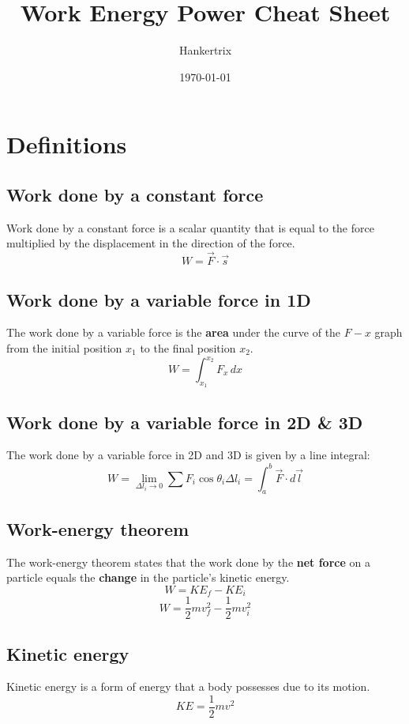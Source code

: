 \documentclass[11pt]{article}
\author{Hankertrix}
\date{\today}
\title{Work Energy Power Cheat Sheet}
\begin{document}
\maketitle
\setcounter{tocdepth}{2}
\tableofcontents

\newpage

\section{Definitions}
\label{sec:org8ba2733}

\subsection{Work done by a constant force}
\label{sec:org7d6426a}
Work done by a constant force is a scalar quantity that is equal to the force multiplied by the displacement in the direction of the force.
\[W = \vec{F} \cdot \vec{s}\]

\subsection{Work done by a variable force in 1D}
\label{sec:org06e703c}
The work done by a variable force is the \textbf{area} under the curve of the \(F-x\) graph from the initial position \(x_1\) to the final position \(x_2\).
\[W = \int_{x_1}^{x_2} F_x \, dx\]

\subsection{Work done by a variable force in 2D \& 3D}
\label{sec:org5fb5338}
The work done by a variable force in 2D and 3D is given by a line integral:
\[W = \lim_{\Delta l_i \rightarrow 0} \sum F_i \cos \theta_i \Delta l_i = \int_a^b \vec{F} \cdot d \vec{l}\]

\subsection{Work-energy theorem}
\label{sec:orgbbe17f6}
The work-energy theorem states that the work done by the \textbf{net force} on a particle equals the \textbf{change} in the particle's kinetic energy.
\[W = KE_{f} - KE_{i}\]
\[W = \frac{1}{2} mv_f^2 - \frac{1}{2}mv_i^2\]

\subsection{Kinetic energy}
\label{sec:org0f02498}
Kinetic energy is a form of energy that a body possesses due to its motion.
\[KE = \frac{1}{2}mv^2\]
\end{document}
